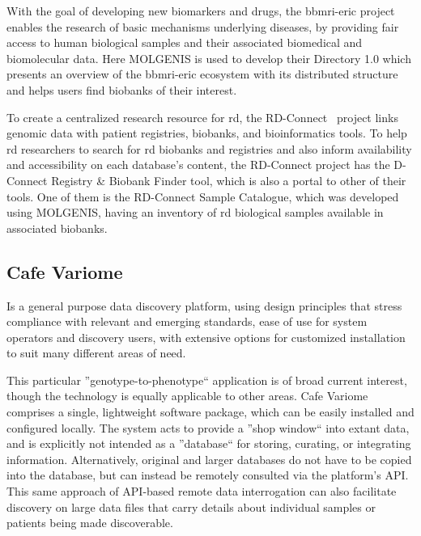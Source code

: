 With the goal of developing new biomarkers and drugs, the \gls{bbmri-eric} project~\cite{bbmrieric} enables the research of basic mechanisms underlying diseases, by providing fair access to human biological samples and their associated biomedical and biomolecular data.
Here MOLGENIS is used to develop their Directory 1.0 which presents an overview of the \gls{bbmri-eric} ecosystem with its distributed structure and helps users find biobanks of their interest.

To create a centralized research resource for \gls{rd}, the RD-Connect~\cite{rdconnect} project links genomic data with patient registries, biobanks, and bioinformatics tools.
To help \gls{rd} researchers to search for \gls{rd} biobanks and registries and also inform availability and accessibility on each database's content, the RD-Connect project has the D-Connect Registry \& Biobank Finder tool, which is also a portal to other of their tools. One of them is the RD-Connect Sample Catalogue, which was developed using MOLGENIS, having an inventory of \gls{rd} biological samples available in associated biobanks.

\subsection*{Cafe Variome}
Is a general purpose data discovery platform, using design principles that stress
compliance with relevant and emerging standards, ease of use for system operators and
discovery users, with extensive options for customized installation to suit many
different areas of need.

This particular ''genotype-to-phenotype`` application is of broad current interest,
though the technology is equally applicable to other areas.
Cafe Variome~\cite{cafevariome} comprises a single, lightweight software package, which can be easily
installed and configured locally.
The system acts to provide a ''shop window`` into extant data, and is explicitly not
intended as a ''database`` for storing, curating, or integrating information.
Alternatively, original and larger databases do not have to be copied into the
database, but can instead be remotely consulted via the platform’s API.
This same approach of API-based remote data interrogation can also facilitate discovery
on large data files that carry details about individual samples or patients being made
discoverable.

